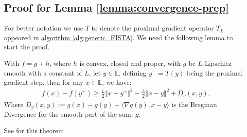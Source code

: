 \subsection{Proof for Lemma \ref*{lemma:convergence-prep}}
    For better notation we use $T$ to denote the proximal gradient operator $T_L$ appeared in \hyperref[alg:generic_FISTA]{algorithm \ref*{alg:generic_FISTA}}. 
    We need the following lemma to start the proof. 
    \begin{lemma}
        With $f = g + h$, where $h$ is convex, closed and proper, with $g$ be $L$-Lipschitz smooth with a constant of $L$, let $y\in \mathbb E$, defining $y^+ = T(y)$ being the proximal gradient step, then for any $x\in \mathbb E$, we have: 
        $$
        \begin{aligned}
        f(x) - f(y^+) \ge \frac{L}{2}\Vert x - y^+\Vert^2 - \frac{L}{2}\Vert x - y\Vert^2 + D_g(x, y),
        \end{aligned}
        $$
        Where $D_g(x, y):= g(x) - g(y) - \langle \nabla g(y), x -y\rangle$ is the Bregman Divergence for the smooth part of the sum: $g$. 
    \end{lemma}
    See \cite[remark 10.17]{beck_first-order_nodate} for this theorem. 
